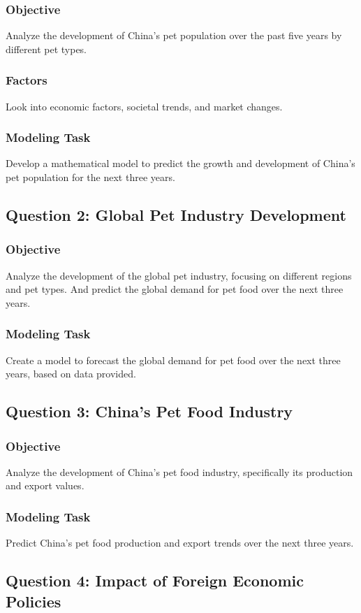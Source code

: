 \documentclass[withoutpreface,bwprint]{cumcmthesis} %
\begin{document}
\subsubsection{Objective}
Analyze the development of China's pet population over the past five years by different pet types.
\subsubsection{Factors}
Look into economic factors, societal trends, and market changes.
\subsubsection{Modeling Task}
Develop a mathematical model to predict the growth and development of China's pet population for the next three years.
\subsection{Question 2: Global Pet Industry Development}
\subsubsection{Objective}
Analyze the development of the global pet industry, focusing on different regions and pet types.
And predict the global demand for pet food over the next three years.
\subsubsection{Modeling Task}
Create a model to forecast the global demand for pet food over the next three years, based on data provided.
\subsection{Question 3: China's Pet Food Industry}
\subsubsection{Objective}
Analyze the development of China's pet food industry, specifically its production and export values.
\subsubsection{Modeling Task}
Predict China's pet food production and export trends over the next three years.
\subsection{Question 4: Impact of Foreign Economic Policies}
\end{document}
